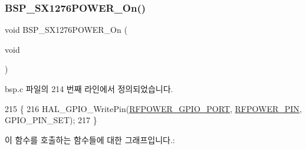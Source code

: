 \subsubsection{\texorpdfstring{B\+S\+P\+\_\+\+S\+X1276\+P\+O\+W\+E\+R\+\_\+\+On()}{BSP\_SX1276POWER\_On()}}
{\footnotesize\ttfamily void B\+S\+P\+\_\+\+S\+X1276\+P\+O\+W\+E\+R\+\_\+\+On (\begin{DoxyParamCaption}\item[{void}]{ }\end{DoxyParamCaption})}



bsp.\+c 파일의 214 번째 라인에서 정의되었습니다.


\begin{DoxyCode}
215 \{
216   HAL\_GPIO\_WritePin(\mbox{\hyperlink{_lory_s_d_k__hw__conf_8h_a8f8e11c368ec33b36ed1ba4d84bdc555}{RFPOWER\_GPIO\_PORT}}, \mbox{\hyperlink{_lory_s_d_k__hw__conf_8h_a15fab54516f17b1b5a79b1fbfc397d79}{RFPOWER\_PIN}}, GPIO\_PIN\_SET); 
217 \}
\end{DoxyCode}
이 함수를 호출하는 함수들에 대한 그래프입니다.\+:
